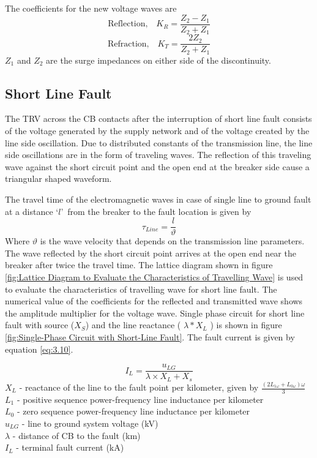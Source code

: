 The coefficients for the new voltage waves are\\
\begin{equation}\label{eq:3.8}
\text{Reflection,~~~} K_R = \frac{Z_2 - Z_1}{Z_2 + Z_1}
\end{equation}
\begin{equation}\label{eq:3.9}
\text{Refraction,~~~} K_T = \frac{2 Z_2}{Z_2 + Z_1}
\end{equation}
$Z_1$ and $Z_2$ are the surge impedances on either side of the discontinuity.

\subsection{Short Line Fault}
The TRV across the CB contacts after the interruption of short line fault consists of the voltage generated by the supply network and of the voltage created by the line side oscillation. Due to distributed constants of the transmission line, the line side oscillations are in the form of traveling waves. The reflection of this traveling wave against the short circuit point and the open end at the breaker side cause a triangular shaped waveform.

The travel time of the electromagnetic waves in case of single line to ground fault at a distance \textquoteleft$l$\textquoteright ~from the breaker to the fault location is given by
\[
\tau_{Line} = \frac{l}{\vartheta}
\]
Where $\vartheta$ is the wave velocity that depends on the transmission line parameters. The wave reflected by the short circuit point arrives at the open end near the breaker after twice the travel time. The lattice diagram shown in figure \ref{fig:Lattice Diagram to Evaluate the Characteristics of Travelling Wave} is used to evaluate the characteristics of travelling wave for short line fault. The numerical value of the coefficients for the reflected and transmitted wave shows the amplitude multiplier for the voltage wave. Single phase circuit for short line fault with source ($X_S$) and the line reactance ( $\lambda * X_L$ ) is shown in figure \ref{fig:Single-Phase Circuit with Short-Line Fault}. The fault current is given by equation \ref{eq:3.10}.

\begin{equation}\label{eq:3.10}
I_L = \frac{u_{LG}}{\lambda \times X_L + X_s}
\end{equation}
$X_L$ - reactance of the line to the fault point per kilometer, given by $\frac{(2L_{1 \omega} + L_{0 \omega})\omega}{3}$\\
$L_1$ - positive sequence power-frequency line inductance per kilometer\\
$L_0$ - zero sequence power-frequency line inductance per kilometer\\
$u_{LG}$ - line to ground system voltage (kV)\\
$\lambda$ - distance of CB to the fault (km)\\
$I_L$ - terminal fault current (kA)

